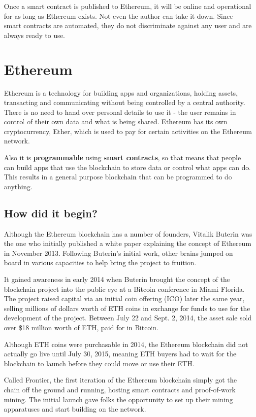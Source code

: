 \documentclass[MSE,Master,english]{twbook}%
\begin{document}
Once a smart contract is published to Ethereum, it will be online and operational for as long as Ethereum exists. Not even the author can take it down. Since smart contracts are automated, they do not discriminate against any user and are always ready to use.\cite{ethereum}

\section{Ethereum\label{eth}}
Ethereum is a technology for building apps and organizations, holding assets, transacting and communicating without being controlled by a central authority. There is no need to hand over personal details to use it - the user remains in control of their own data and what is being shared. Ethereum has its own cryptocurrency, Ether, which is used to pay for certain activities on the Ethereum network.

Also it is \textbf{programmable} using \textbf{smart contracts}, so that means that people can build apps that use the blockchain to store data or control what apps can do. This results in a general purpose blockchain that can be programmed to do anything.\cite{ethereum}

\subsection{How did it begin?}
Although the Ethereum blockchain has a number of founders, Vitalik Buterin\cite{ethHistory} was the one who initially published a white paper explaining the concept of Ethereum in November 2013. Following Buterin's initial work, other brains jumped on board in various capacities to help bring the project to fruition.

It gained awareness in early 2014 when Buterin brought the concept of the blockchain project into the public eye at a Bitcoin conference in Miami Florida. The project raised capital via an initial coin offering (ICO) later the same year, selling millions of dollars worth of ETH coins in exchange for funds to use for the development of the project. Between July 22 and Sept. 2, 2014, the asset sale sold over \$18 million worth of ETH, paid for in Bitcoin.

Although ETH coins were purchasable in 2014, the Ethereum blockchain did not actually go live until July 30, 2015, meaning ETH buyers had to wait for the blockchain to launch before they could move or use their ETH. 

Called Frontier, the first iteration of the Ethereum blockchain simply got the chain off the ground and running, hosting smart contracts and proof-of-work mining. The initial launch gave folks the opportunity to set up their mining apparatuses and start building on the network.
\end{document}
